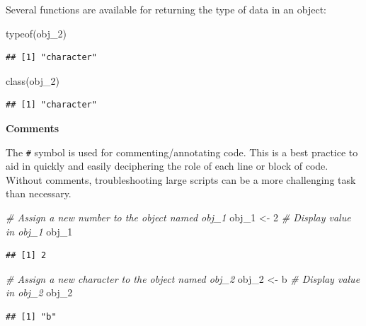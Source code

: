 \documentclass[
]{book}
\newenvironment{Shaded}{\begin{snugshade}}{\end{snugshade}}
\newcommand{\CommentTok}[1]{\textcolor[rgb]{0.56,0.35,0.01}{\textit{#1}}}
\newcommand{\DecValTok}[1]{\textcolor[rgb]{0.00,0.00,0.81}{#1}}
\newcommand{\FunctionTok}[1]{\textcolor[rgb]{0.00,0.00,0.00}{#1}}
\newcommand{\NormalTok}[1]{#1}
\newcommand{\OtherTok}[1]{\textcolor[rgb]{0.56,0.35,0.01}{#1}}
\newcommand{\StringTok}[1]{\textcolor[rgb]{0.31,0.60,0.02}{#1}}
\begin{document}
Several functions are available for returning the type of data in an object:

\begin{Shaded}
\begin{Highlighting}[]
\FunctionTok{typeof}\NormalTok{(obj\_2)}
\end{Highlighting}
\end{Shaded}

\begin{verbatim}
## [1] "character"
\end{verbatim}

\begin{Shaded}
\begin{Highlighting}[]
\FunctionTok{class}\NormalTok{(obj\_2)}
\end{Highlighting}
\end{Shaded}

\begin{verbatim}
## [1] "character"
\end{verbatim}

\textbf{Comments}

The \texttt{\#} symbol is used for commenting/annotating code. This is a best practice to aid in quickly and easily deciphering the role of each line or block of code. Without comments, troubleshooting large scripts can be a more challenging task than necessary.

\begin{Shaded}
\begin{Highlighting}[]
\CommentTok{\# Assign a new number to the object named obj\_1}
\NormalTok{obj\_1 }\OtherTok{\textless{}{-}} \DecValTok{2}
\CommentTok{\# Display value in obj\_1}
\NormalTok{obj\_1}
\end{Highlighting}
\end{Shaded}

\begin{verbatim}
## [1] 2
\end{verbatim}

\begin{Shaded}
\begin{Highlighting}[]
\CommentTok{\# Assign a new character to the object named obj\_2}
\NormalTok{obj\_2 }\OtherTok{\textless{}{-}} \StringTok{\textquotesingle{}b\textquotesingle{}}
\CommentTok{\# Display value in obj\_2}
\NormalTok{obj\_2}
\end{Highlighting}
\end{Shaded}

\begin{verbatim}
## [1] "b"
\end{verbatim}
\end{document}
